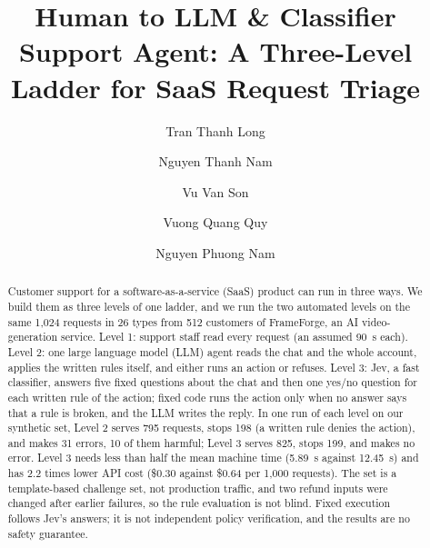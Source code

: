 \documentclass[sigconf,nonacm]{acmart}
\begin{document}
\title{Human to LLM \& Classifier Support Agent: A Three-Level Ladder for SaaS Request Triage}

\author{Tran Thanh Long}

\author{Nguyen Thanh Nam}

\author{Vu Van Son}

\author{Vuong Quang Quy}

\author{Nguyen Phuong Nam}

\renewcommand{\shortauthors}{Tran Thanh Long et al.}

\begin{abstract}
Customer support for a software-as-a-service (SaaS) product can run in three ways. We build them as three levels of one ladder, and we run the two automated levels on the same 1,024 requests in 26 types from 512 customers of FrameForge, an AI video-generation service. Level 1: support staff read every request (an assumed 90~s each). Level 2: one large language model (LLM) agent reads the chat and the whole account, applies the written rules itself, and either runs an action or refuses. Level 3: Jev, a fast classifier, answers five fixed questions about the chat and then one yes/no question for each written rule of the action; fixed code runs the action only when no answer says that a rule is broken, and the LLM writes the reply. In one run of each level on our synthetic set, Level 2 serves 795 requests, stops 198 (a written rule denies the action), and makes 31 errors, 10 of them harmful; Level 3 serves 825, stops 199, and makes no error. Level 3 needs less than half the mean machine time (5.89~s against 12.45~s) and has 2.2 times lower API cost (\$0.30 against \$0.64 per 1,000 requests). The set is a template-based challenge set, not production traffic, and two refund inputs were changed after earlier failures, so the rule evaluation is not blind. Fixed execution follows Jev's answers; it is not independent policy verification, and the results are no safety guarantee.
\end{abstract}
\end{document}
